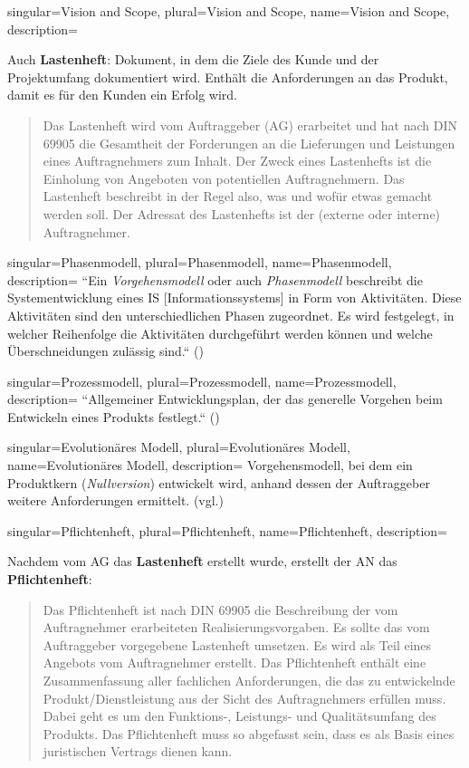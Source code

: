 {
singular={Vision and Scope},
plural={Vision and Scope},
name={Vision and Scope},
description={
Auch \textbf{Lastenheft}: Dokument, in dem die Ziele des Kunde und der Projektumfang dokumentiert wird. Enthält die Anforderungen an das Produkt, damit es für den Kunden ein Erfolg wird.\\
\blockquote[{\cite[305]{AABG14m}}]{
Das Lastenheft wird vom Auftraggeber (AG) erarbeitet und hat
nach DIN 69905 die Gesamtheit der Forderungen an die Lieferungen und Leistungen eines Auftragnehmers zum Inhalt. Der Zweck eines Lastenhefts ist die Einholung von Angeboten von potentiellen Auftragnehmern. Das Lastenheft beschreibt
in der Regel also, was und wofür etwas gemacht werden soll. Der Adressat des
Lastenhefts ist der (externe oder interne) Auftragnehmer.
}


}
}


{
singular={Phasenmodell},
plural={Phasenmodell},
name={Phasenmodell},
description={
``Ein \textit{Vorgehensmodell} oder auch \textit{Phasenmodell} beschreibt die Systementwicklung
eines IS [Informationssystems] in Form von Aktivitäten. Diese Aktivitäten sind den unterschiedlichen
Phasen zugeordnet. Es wird festgelegt, in welcher Reihenfolge die Aktivitäten
durchgeführt werden können und welche Überschneidungen zulässig sind.`` (\cite[316]{AABG14n})
}
}

{
singular={Prozessmodell},
plural={Prozessmodell},
name={Prozessmodell},
description={
``Allgemeiner Entwicklungsplan, der das generelle Vorgehen beim Entwickeln eines Produkts festlegt.`` (\cite[694]{Bal08})
}
}

{
singular={Evolutionäres Modell},
plural={Evolutionäres Modell},
name={Evolutionäres Modell},
description={
Vorgehensmodell, bei dem ein Produktkern (\textit{Nullversion}) entwickelt wird, anhand dessen der Auftraggeber weitere Anforderungen ermittelt. (vgl.\cite[529 f.]{Bal08})
}
}

{
singular={Pflichtenheft},
plural={Pflichtenheft},
name={Pflichtenheft},
description={
Nachdem vom AG das \textbf{Lastenheft} erstellt wurde, erstellt der AN das \textbf{Pflichtenheft}:
\blockquote[{\cite[306]{AABG14m}}]{
Das Pflichtenheft ist nach DIN 69905 die Beschreibung der vom Auftragnehmer erarbeiteten Realisierungsvorgaben. Es sollte das vom Auftraggeber vorgegebene
Lastenheft umsetzen. Es wird als Teil eines Angebots vom Auftragnehmer erstellt.
Das Pflichtenheft enthält eine Zusammenfassung aller fachlichen Anforderungen,
die das zu entwickelnde Produkt/Dienstleistung aus der Sicht des Auftragnehmers
erfüllen muss. Dabei geht es um den Funktions-, Leistungs- und Qualitätsumfang
des Produkts. Das Pflichtenheft muss so abgefasst sein, dass es als Basis eines juristischen Vertrags dienen kann.
}
}
}

